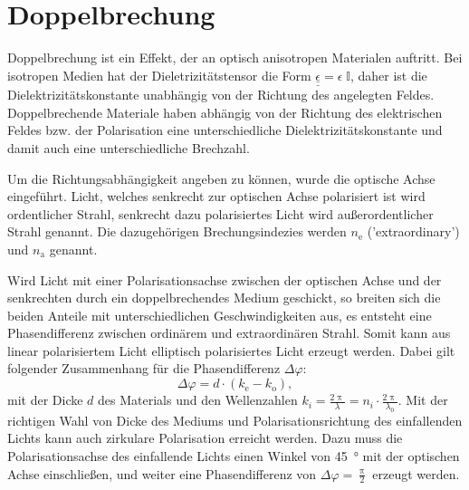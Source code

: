 \section{Doppelbrechung}

Doppelbrechung ist ein Effekt, der an optisch anisotropen Materialen auftritt.
Bei isotropen Medien hat der Dieletrizitätstensor die Form $\underline{\underline{\epsilon}} = \epsilon \; \mathbb{I}$, daher ist die Dielektrizitätskonstante unabhängig von der Richtung des angelegten Feldes.
Doppelbrechende Materiale haben abhängig von der Richtung des elektrischen Feldes bzw. der Polarisation eine unterschiedliche Dielektrizitätskonstante und damit auch eine unterschiedliche Brechzahl.

Um die Richtungsabhängigkeit angeben zu können, wurde die optische Achse eingeführt.
Licht, welches senkrecht zur optischen Achse polarisiert ist wird ordentlicher Strahl, senkrecht dazu polarisiertes Licht wird außerordentlicher Strahl genannt.
Die dazugehörigen Brechungsindezies werden $n_\text{e}$ ('extraordinary') und $n_\text{a}$ genannt.

Wird Licht mit einer Polarisationsachse zwischen der optischen Achse und der senkrechten durch ein doppelbrechendes Medium geschickt, so breiten sich die beiden Anteile mit unterschiedlichen Geschwindigkeiten aus, es entsteht eine Phasendifferenz zwischen ordinärem und extraordinären Strahl.
Somit kann aus linear polarisiertem Licht elliptisch polarisiertes Licht erzeugt werden.
Dabei gilt folgender Zusammenhang für die Phasendifferenz $\Delta \varphi$:
\begin{equation}
	\Delta \varphi = d \cdot \left(k_\text{e} - k_\text{o}\right),
\end{equation}
mit der Dicke $d$ des Materials und den Wellenzahlen $k_i = \frac{2 \uppi}{\lambda} = n_i \cdot \frac{2 \uppi}{\lambda_0}$.
Mit der richtigen Wahl von Dicke des Mediums und Polarisationsrichtung des einfallenden Lichts kann auch zirkulare Polarisation erreicht werden.
Dazu muss die Polarisationsachse des einfallende Lichts einen Winkel von \SI{45}{\degree} mit der optischen Achse einschließen, und weiter eine Phasendifferenz von $\Delta \varphi = \frac{\uppi}{2}$ erzeugt werden.
